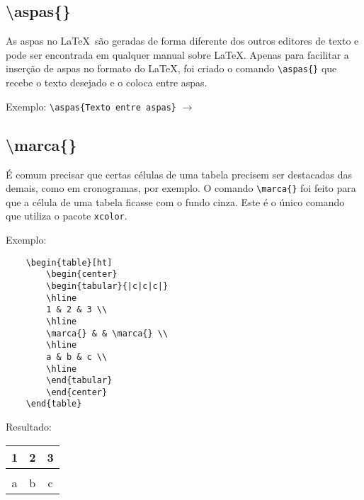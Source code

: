 \documentclass{fei}
\begin{document}
    \subsection{\textbackslash aspas\{\}}
    As aspas no \index{\LaTeX}\LaTeX~são geradas de forma diferente dos outros editores de texto e pode ser encontrada em qualquer manual sobre \index{\LaTeX}\LaTeX. Apenas para facilitar a inserção de aspas no formato do \index{\LaTeX}\LaTeX, foi criado o comando \verb+\aspas{}+ que recebe o texto desejado e o coloca entre aspas.

    Exemplo: \verb+\aspas{Texto entre aspas}+ $\to$ 
    
    \subsection{\textbackslash marca\{\}}
    É comum precisar que certas células de uma tabela precisem ser destacadas das demais, como em cronogramas, por exemplo. O comando \verb+\marca{}+ foi feito para que a célula de uma tabela ficasse com o fundo cinza. Este é o único comando que utiliza o pacote \texttt{xcolor}.

    Exemplo:
    \begin{verbatim}
    \begin{table}[ht]
        \begin{center}
        \begin{tabular}{|c|c|c|}
        \hline
        1 & 2 & 3 \\
        \hline
        \marca{} & & \marca{} \\
        \hline
        a & b & c \\
        \hline
        \end{tabular}
        \end{center}
    \end{table}
    \end{verbatim}
    Resultado: 
    \begin{table}[ht]
        \begin{center}
        \begin{tabular}{|c|c|c|}
        \hline
        1 & 2 & 3 \\
        \hline
        \marca{} & & \marca{} \\
        \hline
        a & b & c \\
        \hline
        \end{tabular}
        \end{center}
    \end{table}
        
\end{document}
